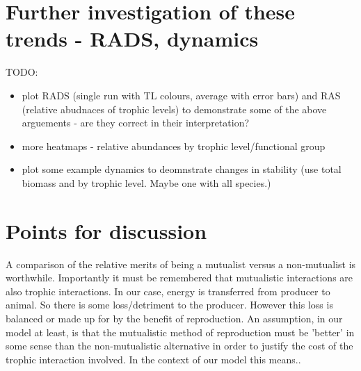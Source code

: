 


\section{Further investigation of these trends - RADS, dynamics}

TODO:

\begin{itemize}
	\item plot RADS (single run with TL colours, average with error bars) and RAS (relative abudnaces of trophic levels) to demonstrate some of the above arguements - are they correct in their interpretation?
	
	\item more heatmaps - relative abundances by trophic level/functional group
	\item plot some example dynamics to deomnstrate changes in stability (use total biomass and by trophic level. Maybe one with all species.)
\end{itemize}

\section{Points for discussion}

A comparison of the relative merits of being a mutualist versus a non-mutualist is worthwhile. Importantly it must be remembered that mutualistic interactions are also trophic interactions. In our case, energy is transferred from producer to animal. So there is some loss/detriment to the producer. However this loss is balanced or made up for by the benefit of reproduction. An assumption, in our model at least, is that the mutualistic method of reproduction must be 'better' in some sense than the non-mutualistic alternative in order to justify the cost of the trophic interaction involved. In the context of our model this means..

